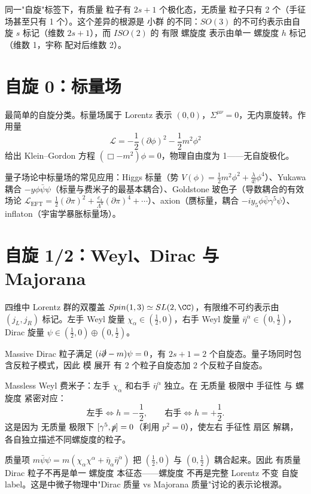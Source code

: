 同一"自旋"标签下，有质量 粒子有 $2s+1$ 个极化态，无质量 粒子只有 2 个（手征场甚至只有 1 个）。这个差异的根源是 小群 的不同：$SO(3)$ 的不可约表示由自旋 $s$ 标记（维数 $2s+1$），而 $ISO(2)$ 的 有限 螺旋度 表示由单一 螺旋度 $h$ 标记（维数 1，宇称 配对后维数 2）。

\section{自旋 0：标量场}

最简单的自旋分类。标量场属于 Lorentz 表示 $(0,0)$，$\Sigma^{\mu\nu}=0$，无内禀旋转。作用量
\begin{equation}
\mathcal{L}=-\frac{1}{2}(\partial\phi)^2-\frac{1}{2}m^2\phi^2
\end{equation}
给出 Klein--Gordon 方程 $(\Box-m^2)\phi=0$，物理自由度为 1——无自旋极化。

量子场论中标量场的常见应用：Higgs 标量（势 $V(\phi)=\frac{1}{2}m^2\phi^2+\frac{\lambda}{4!}\phi^4$）、Yukawa 耦合 $-y\phi\bar\psi\psi$（标量与费米子的最基本耦合）、Goldstone 玻色子（导数耦合的有效场论 $\mathcal{L}_{\text{EFT}}=\frac{1}{2}(\partial\pi)^2+\frac{c_4}{\Lambda^4}(\partial\pi)^4+\cdots$）、axion（赝标量，耦合 $-iy_5\phi\bar\psi\gamma^5\psi$）、inflaton（宇宙学暴胀标量场）。

\section{自旋 1/2：Weyl、Dirac 与 Majorana}

四维中 Lorentz 群的双覆盖 $Spin(1,3)\simeq SL(2,\CC)$，有限维不可约表示由 $(j_L,j_R)$ 标记。左手 Weyl 旋量 $\chi_\alpha\in(\frac{1}{2},0)$，右手 Weyl 旋量 $\bar\eta^{\dot\alpha}\in(0,\frac{1}{2})$，Dirac 旋量 $\psi\in(\frac{1}{2},0)\oplus(0,\frac{1}{2})$。

Massive Dirac 粒子满足 $(i\slashed\partial-m)\psi=0$，有 $2s+1=2$ 个自旋态。量子场同时包含反粒子模式，因此 模 展开 有 2 个粒子自旋态加 2 个反粒子自旋态。

Massless Weyl 费米子：左手 $\chi_\alpha$ 和右手 $\bar\eta^{\dot\alpha}$ 独立。在 无质量 极限中 手征性 与 螺旋度 紧密对应：
\begin{equation}
\text{左手}\Leftrightarrow h=-\frac{1}{2},\qquad \text{右手}\Leftrightarrow h=+\frac{1}{2}.
\end{equation}
这是因为 无质量 极限下 $[\gamma^5,\slashed p]=0$（利用 $p^2=0$），使左右 手征性 扇区 解耦，各自独立描述不同螺旋度的粒子。

质量项 $m\bar\psi\psi=m(\chi_\alpha\chi^\alpha+\bar\eta_{\dot\alpha}\bar\eta^{\dot\alpha})$ 把 $(\frac{1}{2},0)$ 与 $(0,\frac{1}{2})$ 耦合起来。因此 有质量 Dirac 粒子不再是单一 螺旋度 本征态——螺旋度 不再是完整 Lorentz 不变 自旋 label。这是中微子物理中"Dirac 质量 vs Majorana 质量"讨论的表示论根源。


